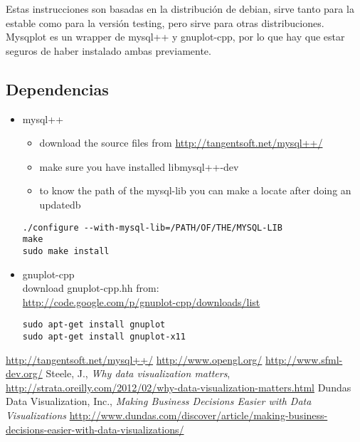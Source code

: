 \documentclass[a4paper,titlepage]{article}
\begin{document}
Estas instrucciones son basadas en la distribución de debian, sirve tanto 
para la estable como para la versión testing, pero sirve para otras distribuciones. Mysqplot 
es un wrapper de mysql++ y gnuplot-cpp, por lo que hay que estar seguros de haber 
instalado ambas previamente. 

\subsection*{Dependencias}
\begin{itemize}
\item mysql++
\begin{itemize}
\item download the source files from \url{http://tangentsoft.net/mysql++/}
\item make sure you have installed libmysql++-dev
\item to know the path of the mysql-lib you can make a locate after doing an updatedb
\end{itemize}
\begin{lstlisting}
./configure --with-mysql-lib=/PATH/OF/THE/MYSQL-LIB
make
sudo make install
\end{lstlisting}
\item gnuplot-cpp\\
download gnuplot-cpp.hh from:\\ \url{http://code.google.com/p/gnuplot-cpp/downloads/list}
\begin{lstlisting}
sudo apt-get install gnuplot
sudo apt-get install gnuplot-x11
\end{lstlisting}
\end{itemize}



\begin{thebibliography}{10}
\url{http://tangentsoft.net/mysql++/}
\url{http://www.opengl.org/}
\url{http://www.sfml-dev.org/}
Steele, J., \textit{Why data visualization matters}, 
		\url{http://strata.oreilly.com/2012/02/why-data-visualization-matters.html}
Dundas Data Visualization, Inc., 
\textit{Making Business Decisions Easier with Data Visualizations} 
\url{http://www.dundas.com/discover/article/making-business-decisions-easier-with-data-visualizations/}
\end{thebibliography}

\end{document}
